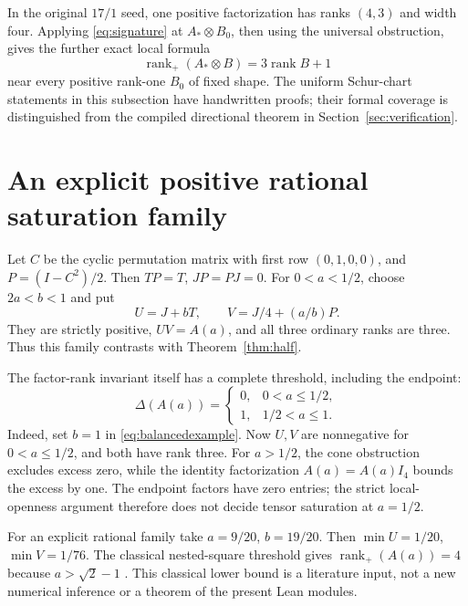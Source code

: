 \documentclass[11pt]{article}
\theoremstyle{definition}\newtheorem{definition}[theorem]{Definition}
\theoremstyle{remark}\newtheorem{remark}[theorem]{Remark}
\newcommand{\rk}{\operatorname{rank}}
\newcommand{\rp}{\operatorname{rank}_{+}}
\begin{document}
In the original $17/1$ seed, one positive factorization has ranks $(4,3)$ and width four. Applying \eqref{eq:signature} at $A_*\otimes B_0$, then using the universal obstruction, gives the further exact local formula
\begin{equation}\label{eq:oldlocal}
\rp(A_*\otimes B)=3\rk B+1
\end{equation}
near every positive rank-one $B_0$ of fixed shape. The uniform Schur-chart statements in this subsection have handwritten proofs; their formal coverage is distinguished from the compiled directional theorem in Section~\ref{sec:verification}.

\section{An explicit positive rational saturation family}\label{sec:explicit}

Let $C$ be the cyclic permutation matrix with first row $(0,1,0,0)$, and $P=(I-C^2)/2$. Then $TP=T$, $JP=PJ=0$. For $0<a<1/2$, choose $2a<b<1$ and put
\begin{equation}\label{eq:balancedexample}
U=J+bT,\qquad V=J/4+(a/b)P.
\end{equation}
They are strictly positive, $UV=A(a)$, and all three ordinary ranks are three. Thus this family contrasts with Theorem~\ref{thm:half}.

The factor-rank invariant itself has a complete threshold, including the endpoint:
\begin{equation}\label{eq:profilethreshold}
\Delta(A(a))=\begin{cases}0,&0<a\le1/2,\\1,&1/2<a\le1.\end{cases}
\end{equation}
Indeed, set $b=1$ in \eqref{eq:balancedexample}. Now $U,V$ are nonnegative for $0<a\le1/2$, and both have rank three. For $a>1/2$, the cone obstruction excludes excess zero, while the identity factorization $A(a)=A(a)I_4$ bounds the excess by one. The endpoint factors have zero entries; the strict local-openness argument therefore does not decide tensor saturation at $a=1/2$.

For an explicit rational family take $a=9/20$, $b=19/20$. Then $\min U=1/20$, $\min V=1/76$. The classical nested-square threshold gives $\rp(A(a))=4$ because $a>\sqrt2-1$ \cite[Example~2]{BCR}\cite[\S6.1]{VGGT}. This classical lower bound is a literature input, not a new numerical inference or a theorem of the present Lean modules.
\end{document}
